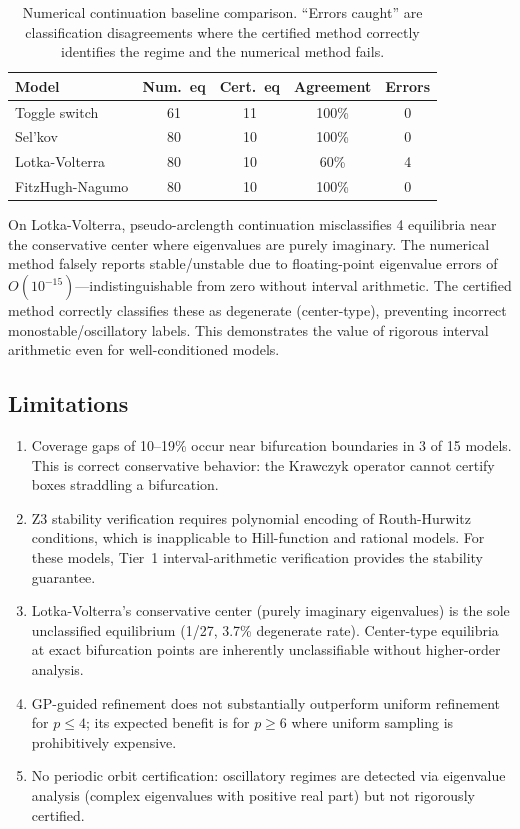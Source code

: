 \documentclass[11pt]{article}
\begin{document}
\begin{table}[t]
\centering
\caption{Numerical continuation baseline comparison. ``Errors caught'' are classification disagreements where the certified method correctly identifies the regime and the numerical method fails.}
\label{tab:baseline}
\small
\begin{tabular}{@{}lcccc@{}}
\toprule
Model & Num.\ eq & Cert.\ eq & Agreement & Errors \\
\midrule
Toggle switch         & 61  & 11  & 100\% & 0 \\
Sel'kov               & 80  & 10  & 100\% & 0 \\
Lotka-Volterra        & 80  & 10  & 60\%  & 4 \\
FitzHugh-Nagumo       & 80  & 10  & 100\% & 0 \\
\bottomrule
\end{tabular}
\end{table}

On Lotka-Volterra, pseudo-arclength continuation misclassifies 4 equilibria near the conservative center where eigenvalues are purely imaginary.
The numerical method falsely reports stable/unstable due to floating-point eigenvalue errors of $O(10^{-15})$---indistinguishable from zero without interval arithmetic.
The certified method correctly classifies these as degenerate (center-type), preventing incorrect monostable/oscillatory labels.
This demonstrates the value of rigorous interval arithmetic even for well-conditioned models.

\subsection{Limitations}

\begin{enumerate}[leftmargin=*]
\item Coverage gaps of 10--19\% occur near bifurcation boundaries in 3 of 15 models.  This is correct conservative behavior: the Krawczyk operator cannot certify boxes straddling a bifurcation.

\item Z3 stability verification requires polynomial encoding of Routh-Hurwitz conditions, which is inapplicable to Hill-function and rational models.  For these models, Tier~1 interval-arithmetic verification provides the stability guarantee.

\item Lotka-Volterra's conservative center (purely imaginary eigenvalues) is the sole unclassified equilibrium (1/27, 3.7\% degenerate rate).  Center-type equilibria at exact bifurcation points are inherently unclassifiable without higher-order analysis.

\item GP-guided refinement does not substantially outperform uniform refinement for $p \leq 4$; its expected benefit is for $p \geq 6$ where uniform sampling is prohibitively expensive.

\item No periodic orbit certification: oscillatory regimes are detected via eigenvalue analysis (complex eigenvalues with positive real part) but not rigorously certified.
\end{enumerate}
\end{document}
